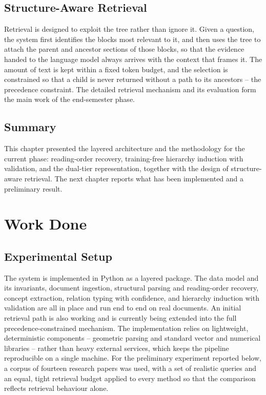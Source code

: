 \documentclass[12pt, a4paper, openright, twoside]{report}
\begin{document}
\section{Structure-Aware Retrieval}
Retrieval is designed to exploit the tree rather than ignore it. Given a question, the system first identifies the blocks most relevant to it, and then uses the tree to attach the parent and ancestor sections of those blocks, so that the evidence handed to the language model always arrives with the context that frames it. The amount of text is kept within a fixed token budget, and the selection is constrained so that a child is never returned without a path to its ancestors -- the precedence constraint. The detailed retrieval mechanism and its evaluation form the main work of the end-semester phase.

\section{Summary}
This chapter presented the layered architecture and the methodology for the current phase: reading-order recovery, training-free hierarchy induction with validation, and the dual-tier representation, together with the design of structure-aware retrieval. The next chapter reports what has been implemented and a preliminary result.

\chapter{Work Done}
\label{workdone}

\section{Experimental Setup}
The system is implemented in Python as a layered package. The data model and its invariants, document ingestion, structural parsing and reading-order recovery, concept extraction, relation typing with confidence, and hierarchy induction with validation are all in place and run end to end on real documents. An initial retrieval path is also working and is currently being extended into the full precedence-constrained mechanism. The implementation relies on lightweight, deterministic components -- geometric parsing and standard vector and numerical libraries -- rather than heavy external services, which keeps the pipeline reproducible on a single machine. For the preliminary experiment reported below, a corpus of fourteen research papers was used, with a set of realistic queries and an equal, tight retrieval budget applied to every method so that the comparison reflects retrieval behaviour alone.
\end{document}
